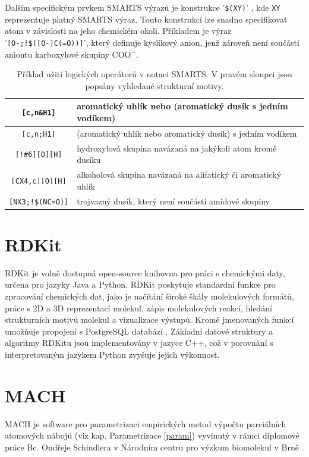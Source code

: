 Dalším specifickým prvkem SMARTS výrazů je konstrukce  '\verb|$(XY)|' , kde \verb|XY| reprezentuje platný SMARTS výraz. Touto konstrukcí lze snadno specifikovat atom v závislosti na jeho chemickém okolí. Příkladem je výraz '\verb|[O-;!$([O-]C(=O))]|', který definuje kyslíkový anion, jenž zároveň není součástí aniontu karboxylové skupiny COO$^-$. 
\begin{table}[h]
\label{logops}
\renewcommand{\arraystretch}{1.3}
    \begin{small}
    \hspace{7mm}\begin{tabular}{c|l}
        \verb|[c,n&H1]| & aromatický uhlík nebo (aromatický dusík s jedním vodíkem) \\
        \hline
        \verb|[c,n;H1]| & (aromatický uhlík nebo aromatický dusík) s jedním vodíkem \\
        \hline
        \verb|[!#6][O][H]| & hydroxylová skupina navázaná na jakýkoli atom kromě dusíku \\
        \hline
        \verb|[CX4,c][O][H]| & alkoholová skupina navázaná na alifatický či aromatický uhlík \\
        \hline
        \verb|[NX3;!$(NC=O)]| & trojvazný dusík, který není součástí amidové skupiny\\
    \end{tabular}
    \end{small}
    \caption{Příklad užití logických operátorů v notaci SMARTS. V pravém sloupci jsou popsány vyhledané strukturní motivy.}
\end{table}
\section{RDKit}
RDKit \cite{rdk_info} je volně dostupná open-source knihovna pro práci s chemickými daty, určena pro jazyky Java a Python. RDKit poskytuje standardní funkce pro zpracování chemických dat, jako je načítání široké škály molekulových formátů, práce s 2D a 3D reprezentací molekul, zápis molekulových reakcí, hledání strukturních motivů molekul a vizualizace výstupů. Kromě jmenovaných funkcí umožňuje propojení s PostgreSQL databází \cite{Postgre}. Základní datové struktury a algoritmy RDKitu jsou implementovány v jazyce C++, což v porovnání s interpretovaným jazykem Python zvyšuje jejich výkonnost.

\section{MACH}
MACH je software pro parametrizaci empirických metod výpočtu parciálních atomových nábojů (viz kap. Parametrizace \ref{param}) vyvinutý v rámci diplomové práce Bc. Ondřeje Schindlera v Národním centru pro výzkum biomolekul v Brně \cite{mach}. 

